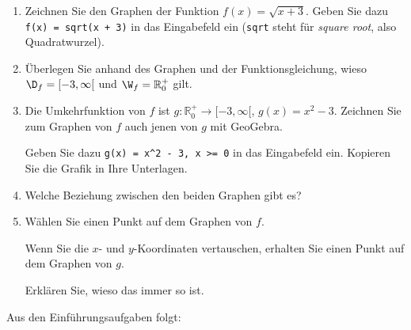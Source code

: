 \begin{enumerate}
    \item Zeichnen Sie den Graphen der Funktion \(f(x)=\sqrt{x+3}\).
          Geben Sie dazu \texttt{f(x) = sqrt(x + 3)} in das Eingabefeld ein (\texttt{sqrt} steht für \emph{square root}, also Quadratwurzel).

    \item Überlegen Sie anhand des Graphen und der Funktionsgleichung, wieso $\D_f=[-3,\infty[$ und $\W_f=\mathbb{R}_0^{+}$ gilt.
    \item Die Umkehrfunktion von \(f\) ist \(g\colon \mathbb{R}_0^{+}\to[-3,\infty[\), \(g(x)=x^{2}-3\). Zeichnen Sie zum Graphen von \(f\) auch jenen von \(g\) mit GeoGebra.

          Geben Sie dazu \verb|g(x) = x^2 - 3, x >= 0| in das Eingabefeld ein. Kopieren Sie die Grafik in Ihre Unterlagen.
    \item Welche Beziehung zwischen den beiden Graphen gibt es?

    \item Wählen Sie einen Punkt auf dem Graphen von \(f\).

          Wenn Sie die \(x\)- und \(y\)-Koordinaten vertauschen, erhalten Sie einen Punkt auf dem Graphen von \(g\).

          Erklären Sie, wieso das immer so ist.
\end{enumerate}
\newpage
Aus den Einführungsaufgaben folgt:
